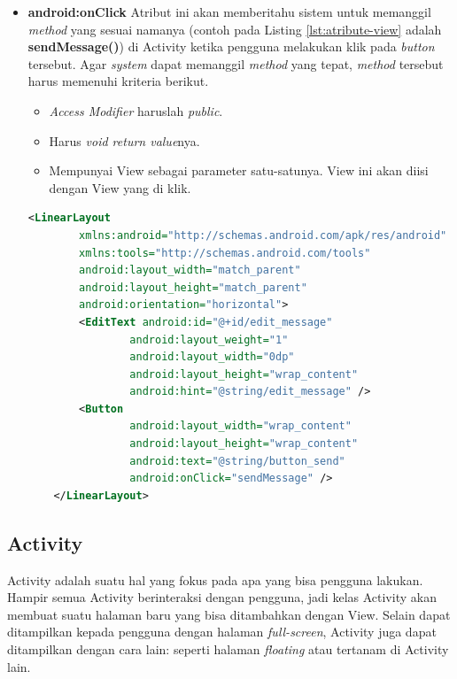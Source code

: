 \begin{itemize}
\begin{lstlisting}[caption={Contoh kode pada string.xml},label={lst:string-xml},language=xml]
\end{lstlisting}


	\item \textbf{android:onClick}
	Atribut ini akan memberitahu sistem untuk memanggil \textit{method} yang sesuai namanya (contoh pada Listing \ref{lst:atribute-view} adalah \textbf{sendMessage()}) di Activity ketika pengguna melakukan klik pada \textit{button} tersebut. Agar \textit{system} dapat memanggil \textit{method} yang tepat, \textit{method} tersebut harus memenuhi kriteria berikut.
	\begin{itemize}
		\item \textit{Access Modifier} haruslah \textit{public}.
		\item Harus \textit{void return value}nya.
		\item Mempunyai View sebagai parameter satu-satunya. View ini akan diisi dengan View yang di klik.
	\end{itemize}
\begin{lstlisting}[caption={Contoh kode file XML pada folder layout},label={lst:atribute-view},language=xml]
	<LinearLayout
		xmlns:android="http://schemas.android.com/apk/res/android"
		xmlns:tools="http://schemas.android.com/tools"
		android:layout_width="match_parent"
		android:layout_height="match_parent"
		android:orientation="horizontal">
		<EditText android:id="@+id/edit_message"
				android:layout_weight="1"
				android:layout_width="0dp"
				android:layout_height="wrap_content"
				android:hint="@string/edit_message" />
		<Button
				android:layout_width="wrap_content"
				android:layout_height="wrap_content"
				android:text="@string/button_send"
				android:onClick="sendMessage" />
	</LinearLayout>
\end{lstlisting}
\end{itemize}


\subsection{Activity}
\label{sec:activity}
Activity adalah suatu hal yang fokus pada apa yang bisa pengguna lakukan.
\cite{android_developers} Hampir semua Activity berinteraksi dengan pengguna, jadi kelas Activity akan membuat suatu halaman baru yang bisa ditambahkan dengan View. Selain dapat ditampilkan kepada pengguna dengan halaman \textit{full-screen}, Activity juga dapat ditampilkan dengan cara lain: seperti halaman \textit{floating} atau tertanam di Activity lain.


